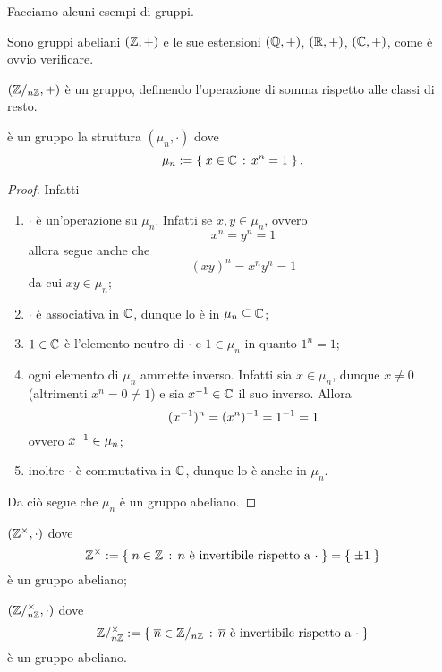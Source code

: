 Facciamo alcuni esempi di gruppi.
\begin{example}
    Sono gruppi abeliani $(\mathbb{Z}, +)$ e le sue estensioni $(\mathbb{Q}, +)$, $(\mathbb{R}, +)$, $(\mathbb{C}, +)$, come è ovvio verificare.
\end{example}
\begin{example}
    $(\mathbb{Z}/_{n\mathbb{Z}}, +)$ è un gruppo, definendo l'operazione di somma rispetto alle classi di resto.
\end{example}
\begin{example}
    è un gruppo la struttura $(\mu_n, \cdot)$ dove \[
        \mu_n := \left\{\;x \in \mathbb{C} \,:\, x^n = 1\;\right\}.    
    \]
\end{example}
\begin{proof}
    Infatti \begin{enumerate}[label={(G\arabic*)}, start=0]
        \item $\cdot$ è un'operazione su $\mu_n$. Infatti se $x, y \in \mu_n$, ovvero \[
            x^n = y^n = 1    
        \] allora segue anche che \[
            (xy)^n = x^ny^n = 1    
        \] da cui $xy \in \mu_n$;
        \item $\cdot$ è associativa in $\mathbb{C}$, dunque lo è in $\mu_n \subseteq \mathbb{C}$;
        \item $1 \in \mathbb{C}$ è l'elemento neutro di $\cdot$ e $1 \in \mu_n$ in quanto $1^n = 1$;
        \item ogni elemento di $\mu_n$ ammette inverso. Infatti sia $x \in \mu_n$, dunque $x \neq 0$ (altrimenti $x^n = 0 \neq 1$) e sia $x^{-1} \in \mathbb{C}$ il suo inverso. Allora \[
            (x^{-1})^n = (x^n)^{-1} = 1^{-1} = 1    
        \] ovvero $x^{-1} \in \mu_n$;
        \item inoltre $\cdot$ è commutativa in $\mathbb{C}$, dunque lo è anche in $\mu_n$.
    \end{enumerate}
    Da ciò segue che $\mu_n$ è un gruppo abeliano.
\end{proof}
\begin{example}
    $(\mathbb{Z}^{\times}, \cdot)$ dove \[
        \mathbb{Z}^{\times} := \left\{\;n \in \mathbb{Z} \,:\, n \text{ è invertibile rispetto a } \cdot\;\right\} = \left\{\;\pm 1\;\right\}
    \] è un gruppo abeliano;
\end{example}
\begin{example}
    $(\mathbb{Z}/_{n\mathbb{Z}}^{\times}, \cdot)$ dove \[
        \invert{\Zmod{n}} \deq \set{\eqcl n \in \Zmod{n} \suchthat \eqcl n \text{ è invertibile rispetto a } \cdot}
    \] è un gruppo abeliano.
\end{example}
